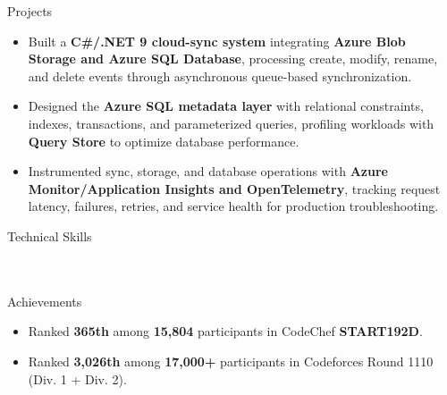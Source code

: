 \documentclass{resume}
\begin{document}
\begin{experienceSection}{Projects}
    \begin{itemize}
        \vspace{-0.5em}
        \itemsep -6pt {}

        \item Built a \textbf{C\#/.NET 9 cloud-sync system} integrating \textbf{Azure Blob Storage and Azure SQL Database}, processing create, modify, rename, and delete events through asynchronous queue-based synchronization.

        \item Designed the \textbf{Azure SQL metadata layer} with relational constraints, indexes, transactions, and parameterized queries, profiling workloads with \textbf{Query Store} to optimize database performance.

        \item Instrumented sync, storage, and database operations with \textbf{Azure Monitor/Application Insights and OpenTelemetry}, tracking request latency, failures, retries, and service health for production troubleshooting.

    \end{itemize}

\end{experienceSection}


\begin{skillsSection}{Technical Skills}
    \skillItem[
        category={Languages:},
        skills={C\#, C/C++, Go, Python, JavaScript, SQL, Rust}
    ]
    \\
    \skillItem[
        category={Backend \& Systems:},
        skills={.NET 9, REST APIs, gRPC, PostgreSQL, Redis, Distributed Systems, System Design}
    ]
    \\
    \skillItem[
        category={Cloud \& Infrastructure:},
        skills={Microsoft Azure, AKS, Azure Blob Storage, AWS, EKS, Kubernetes, Docker, Terraform, CI/CD}
    ]
    \\
    \skillItem[
        category={Reliability \& Observability:},
        skills={Prometheus, Grafana, Telemetry, Logging, Fault Tolerance, Pytest, Playwright}
    ]
\end{skillsSection}


\begin{achievementSection}{Achievements}
    \begin{itemize}
        \itemsep -6pt {}
        \item Ranked \textbf{365th} among \textbf{15,804} participants in CodeChef \textbf{START192D}.
        \item Ranked \textbf{3,026th} among \textbf{17,000+} participants in Codeforces Round 1110 (Div. 1 + Div. 2).

    \end{itemize}
\end{achievementSection}
\end{document}
